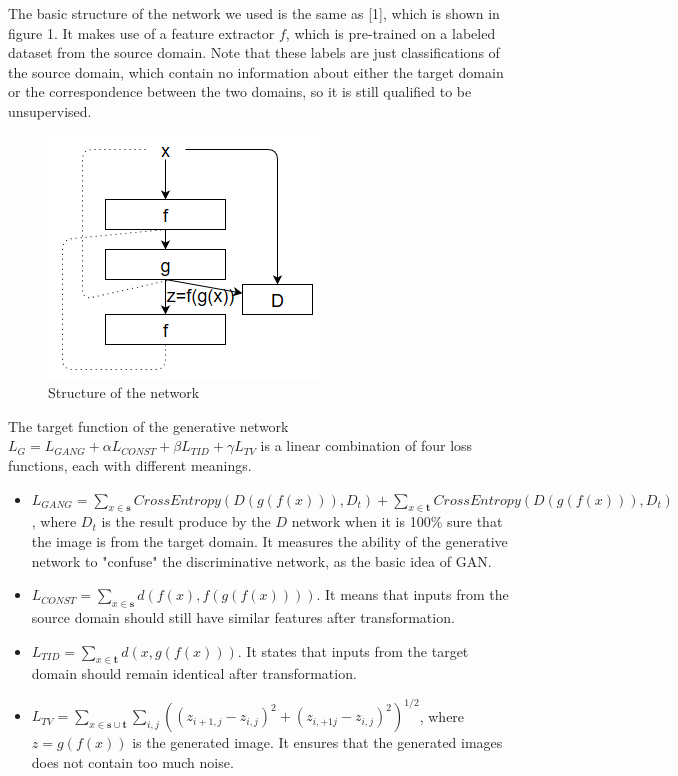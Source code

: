 \documentclass{article}
\begin{document}
The basic structure of the network we used is the same as [1], which is shown in figure 1. It makes use of a feature extractor $f$, which is pre-trained on a labeled dataset from the source domain. Note that these labels are just classifications of the source domain, which contain no information about either the target domain or the correspondence between the two domains, so it is still qualified to be unsupervised.

\begin{figure}[H]
	\centering
	\includegraphics[width = 8 cm]{img/network.png}
	\caption{Structure of the network}
\end{figure}

The target function of the generative network $L_G=L_{GANG}+\alpha L_{CONST}+\beta L_{TID}+\gamma L_{TV}$ is a linear combination of four loss functions, each with different meanings.

\begin{itemize}
\item $L_{GANG}=\sum_{x\in \mathbf{s}}CrossEntropy(D(g(f(x))), D_t)+\sum_{x\in \mathbf{t}}CrossEntropy(D(g(f(x))), D_t)$, where $D_t$ is the result produce by the $D$ network when it is 100\% sure that the image is from the target domain. It measures the ability of the generative network to "confuse" the discriminative network, as the basic idea of GAN. 
\item $L_{CONST}=\sum_{x\in \mathbf{s}}d(f(x), f(g(f(x))))$. It means that inputs from the source domain should still have similar features after transformation.
\item $L_{TID}=\sum_{x\in \mathbf{t}}d(x, g(f(x)))$. It states that inputs from the target domain should remain identical after transformation.
\item $L_{TV}=\sum_{x\in \mathbf{s} \cup \mathbf{t}}\sum_{i,j}((z_{i+1,j}-z_{i,j})^2+(z_{i,+1j}-z_{i,j})^2)^{1/2}$, where $z=g(f(x))$ is the generated image. It ensures that the generated images does not contain too much noise.
\end{itemize}
\end{document}
